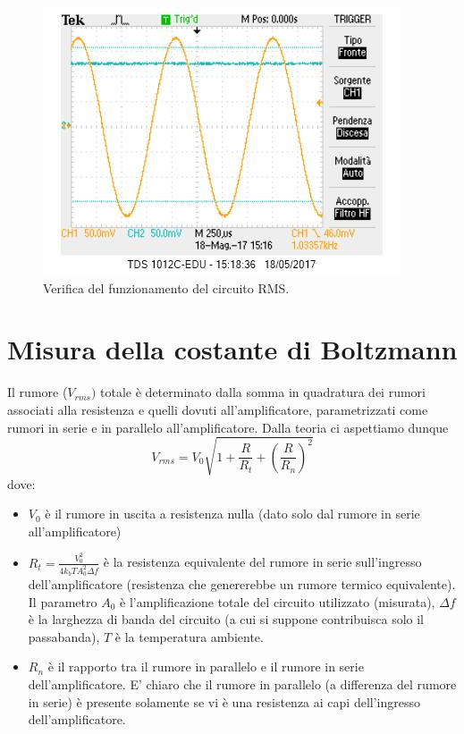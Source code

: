 \documentclass[10pt,a4paper]{article}
\begin{document}
\begin{figure}[!htb]
\centering
\includegraphics[scale=1.0]{vrms.jpg}
\caption{Verifica del funzionamento del circuito RMS.\label{rms}}
\end{figure}

\section{Misura della costante di Boltzmann}

Il rumore ($V_{rms})$ totale è determinato dalla somma in quadratura dei rumori associati alla resistenza e quelli dovuti all'amplificatore, parametrizzati come rumori in serie e in parallelo all'amplificatore. Dalla teoria ci aspettiamo dunque 
\begin{equation}
V_{rms} = V_0 \sqrt{1+\frac{R}{R_t}+(\frac{R}{R_n})^2}
\end{equation}
dove:
\begin{itemize}
\item $V_0$ è il rumore in uscita a resistenza nulla (dato solo dal rumore in serie all'amplificatore)
\item $R_t = \frac{V_0^2}{4 k_b T A_0^2 \Delta f}$ è la resistenza equivalente del rumore in serie sull'ingresso dell'amplificatore (resistenza che genererebbe un rumore termico equivalente). Il parametro $A_0$ è l'amplificazione totale del circuito utilizzato (misurata), $\Delta f$ è la larghezza di banda del circuito (a cui si suppone contribuisca solo il passabanda), $T$ è la temperatura ambiente.\\
\item $R_n$ è il rapporto tra il rumore in parallelo e il rumore in serie dell'amplificatore. E' chiaro che il rumore in parallelo (a differenza del rumore in serie) è presente solamente se vi è una resistenza ai capi dell'ingresso dell'amplificatore.%
\end{itemize}
\end{document}
